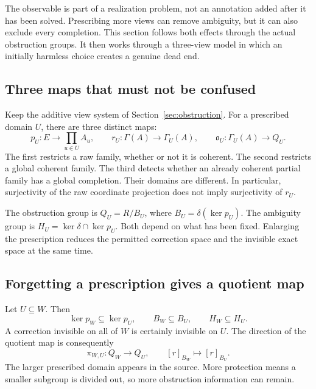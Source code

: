 \label{sec:prescription}
The observable is part of a realization problem, not an annotation added after it has been solved. Prescribing more views can remove ambiguity, but it can also exclude every completion. This section follows both effects through the actual obstruction groups. It then works through a three-view model in which an initially harmless choice creates a genuine dead end.

\subsection{Three maps that must not be confused}
Keep the additive view system of Section~\ref{sec:obstruction}. For a prescribed domain \(U\), there are three distinct maps:
\[
 p_U:E\longrightarrow\prod_{u\in U}A_u,\qquad
 r_U:\Gamma(A)\longrightarrow\Gamma_U(A),\qquad
 \mathfrak o_U:\Gamma_U(A)\longrightarrow Q_U.
\]
The first restricts a raw family, whether or not it is coherent. The second restricts a global coherent family. The third detects whether an already coherent partial family has a global completion. Their domains are different. In particular, surjectivity of the raw coordinate projection does not imply surjectivity of \(r_U\).

The obstruction group is \(Q_U=R/B_U\), where \(B_U=\delta(\ker p_U)\). The ambiguity group is \(H_U=\ker\delta\cap\ker p_U\). Both depend on what has been fixed. Enlarging the prescription reduces the permitted correction space and the invisible exact space at the same time.

\subsection{Forgetting a prescription gives a quotient map}
Let \(U\subseteq W\). Then
\[
 \ker p_W\subseteq\ker p_U,\qquad B_W\subseteq B_U,
 \qquad H_W\subseteq H_U.
\]
A correction invisible on all of \(W\) is certainly invisible on \(U\). The direction of the quotient map is consequently
\[
 \pi_{W,U}:Q_W\longrightarrow Q_U,\qquad
 [r]_{B_W}\longmapsto[r]_{B_U}.
\]
The larger prescribed domain appears in the source. More protection means a smaller subgroup is divided out, so more obstruction information can remain.

